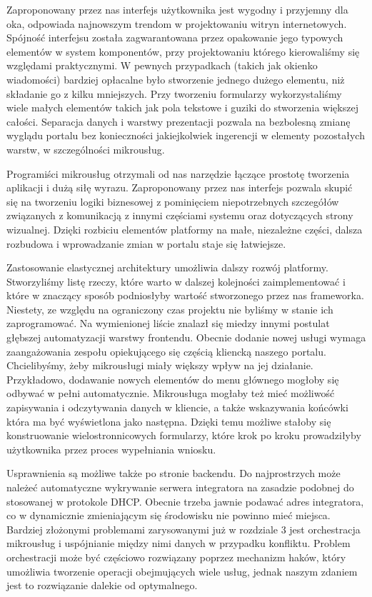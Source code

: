 \documentclass[licencjacka]{pracamgr}
\begin{document}
Zaproponowany przez nas interfejs użytkownika jest wygodny i przyjemny dla oka,
odpowiada najnowszym trendom w projektowaniu witryn internetowych. Spójność interfejsu
została zagwarantowana przez opakowanie jego typowych elementów w system komponentów,
przy projektowaniu którego kierowaliśmy się względami praktycznymi. W pewnych przypadkach
(takich jak okienko wiadomości) bardziej opłacalne było stworzenie jednego dużego
elementu, niż składanie go z kilku mniejszych. Przy tworzeniu formularzy wykorzystaliśmy
wiele małych elementów takich jak pola tekstowe i guziki do stworzenia większej
całości. Separacja danych i warstwy prezentacji pozwala na bezbolesną zmianę wyglądu
portalu bez konieczności jakiejkolwiek ingerencji w elementy pozostałych warstw, w
szczególności mikrousług.

Programiści mikrousług otrzymali od nas narzędzie łączące prostotę tworzenia aplikacji
i dużą siłę wyrazu. Zaproponowany przez nas interfejs pozwala skupić się na tworzeniu
logiki biznesowej z pominięciem niepotrzebnych szczegółów związanych z komunikacją
z innymi częściami systemu oraz dotyczących strony wizualnej. Dzięki rozbiciu
elementów platformy na małe, niezależne części, dalsza rozbudowa i wprowadzanie zmian
w portalu staje się łatwiejsze.

Zastosowanie elastycznej architektury umożliwia dalszy rozwój platformy. Stworzyliśmy
listę rzeczy, które warto w dalszej kolejności zaimplementować i które w znaczący
sposób podniosłyby wartość stworzonego przez nas frameworka. Niestety, ze względu na
ograniczony czas projektu nie byliśmy w stanie ich zaprogramować. Na wymienionej liście
znalazł się miedzy innymi postulat głębszej automatyzacji warstwy frontendu. Obecnie
dodanie nowej usługi wymaga zaangażowania zespołu opiekującego się częścią kliencką
naszego portalu. Chcielibyśmy, żeby mikrousługi miały większy wpływ na jej działanie.
Przykładowo, dodawanie nowych elementów do menu głównego mogłoby się odbywać w pełni
automatycznie. Mikrousługa mogłaby też mieć możliwość zapisywania i odczytywania danych
w kliencie, a także wskazywania końcówki która ma być wyświetlona jako następna.
Dzięki temu możliwe stałoby się konstruowanie wielostronnicowych formularzy, które
krok po kroku prowadziłyby użytkownika przez proces wypełniania wniosku.

Usprawnienia są możliwe także po stronie backendu. Do najprostrzych może należeć
automatyczne wykrywanie serwera integratora na zasadzie podobnej do stosowanej
w protokole DHCP. Obecnie trzeba jawnie podawać adres integratora, co w dynamicznie
zmieniającym się środowisku nie powinno mieć miejsca. Bardziej złożonymi problemami
zarysowanymi już w rozdziale 3 jest orchestracja mikrousług i uspójnianie między
nimi danych w przypadku konfliktu. Problem orchestracji może być częściowo
rozwiązany poprzez mechanizm haków, który umożliwia tworzenie operacji obejmujących
wiele usług, jednak naszym zdaniem jest to rozwiązanie dalekie od optymalnego.
\end{document}
